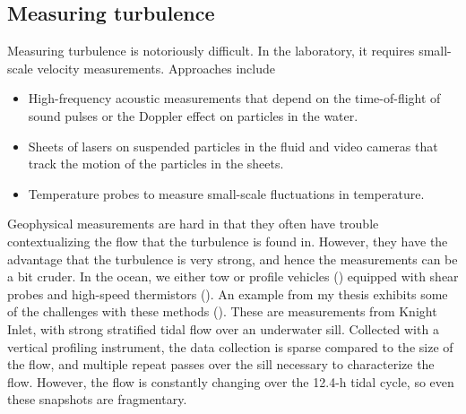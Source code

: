 \documentclass[11pt]{article}
\begin{document}
\subsection{Measuring turbulence}

Measuring turbulence is notoriously difficult. In the laboratory, it requires
small-scale velocity measurements.  Approaches include 
\begin{itemize}
  \item High-frequency acoustic  measurements that depend on the time-of-flight
of sound pulses or the Doppler effect on particles in the water. 
  \item Sheets of lasers on suspended particles in the fluid and video cameras
that track the motion of the particles in the sheets.  
  \item Temperature probes to measure small-scale fluctuations in temperature. 

\end{itemize}

Geophysical measurements are hard in that they often have trouble
contextualizing the flow that the turbulence is found in.  However, they have
the advantage that the turbulence is very strong, and hence the measurements
can be a bit cruder.  In the ocean, we either tow or profile vehicles
() equipped with shear probes and high-speed
thermistors ().  An example from my thesis exhibits
some of the challenges with these methods (). 
These are measurements from Knight Inlet, with strong stratified tidal flow
over an underwater sill.  Collected with a vertical profiling instrument, the
data collection is sparse compared to the size of the flow, and multiple repeat
passes over the sill necessary to characterize the flow.  However, the flow is
constantly changing over the 12.4-h tidal cycle, so even these snapshots are
fragmentary.  
\end{document}
